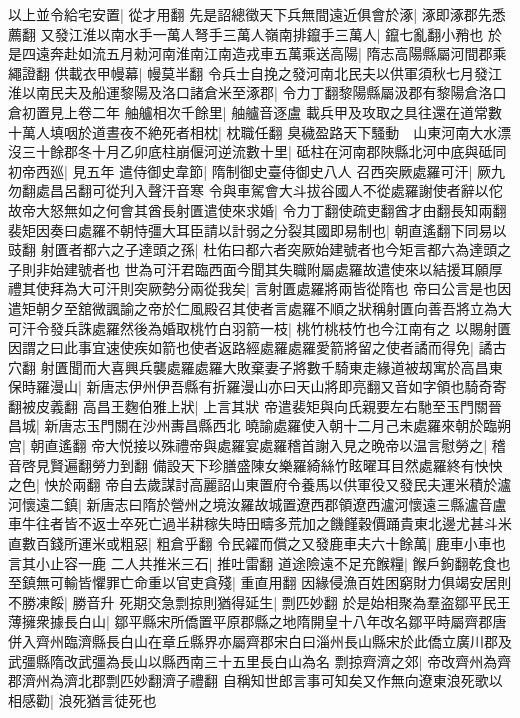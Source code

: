 以上並令給宅安置|{
	從才用翻}
先是詔總徵天下兵無間遠近俱會於涿|{
	涿即涿郡先悉薦翻}
又發江淮以南水手一萬人弩手三萬人嶺南排鑹手三萬人|{
	鑹七亂翻小矟也}
於是四遠奔赴如流五月勑河南淮南江南造戎車五萬乘送高陽|{
	隋志高陽縣屬河間郡乘繩證翻}
供載衣甲幔幕|{
	幔莫半翻}
令兵士自挽之發河南北民夫以供軍須秋七月發江淮以南民夫及船運黎陽及洛口諸倉米至涿郡|{
	令力丁翻黎陽縣屬汲郡有黎陽倉洛口倉初置見上卷二年}
舳艫相次千餘里|{
	舳艫音逐盧}
載兵甲及攻取之具往還在道常數十萬人填咽於道晝夜不絶死者相枕|{
	枕職任翻}
臭穢盈路天下騷動　山東河南大水漂沒三十餘郡冬十月乙卯底柱崩偃河逆流數十里|{
	砥柱在河南郡陜縣北河中底與砥同}
初帝西廵|{
	見五年}
遣侍御史韋節|{
	隋制御史臺侍御史八人}
召西突厥處羅可汗|{
	厥九勿翻處昌呂翻可從刋入聲汗音寒}
令與車駕會大斗拔谷國人不從處羅謝使者辭以佗故帝大怒無如之何會其酋長射匱遣使來求婚|{
	令力丁翻使疏吏翻酋才由翻長知兩翻}
裴矩因奏曰處羅不朝恃彊大耳臣請以計弱之分裂其國即易制也|{
	朝直遙翻下同易以豉翻}
射匱者都六之子達頭之孫|{
	杜佑曰都六者突厥始建號者也今矩言都六為達頭之子則非始建號者也}
世為可汗君臨西面今聞其失職附屬處羅故遣使來以結援耳願厚禮其使拜為大可汗則突厥勢分兩從我矣|{
	言射匱處羅將兩皆從隋也}
帝曰公言是也因遣矩朝夕至舘微諷諭之帝於仁風殿召其使者言處羅不順之狀稱射匱向善吾將立為大可汗令發兵誅處羅然後為婚取桃竹白羽箭一枝|{
	桃竹桃枝竹也今江南有之}
以賜射匱因謂之曰此事宜速使疾如箭也使者返路經處羅處羅愛箭將留之使者譎而得免|{
	譎古穴翻}
射匱聞而大喜興兵襲處羅處羅大敗棄妻子將數千騎東走緣道被刼寓於高昌東保時羅漫山|{
	新唐志伊州伊吾縣有折羅漫山亦曰天山將即亮翻又音如字領也騎奇寄翻被皮義翻}
高昌王麴伯雅上狀|{
	上言其狀}
帝遣裴矩與向氏親要左右馳至玉門關晉昌城|{
	新唐志玉門關在沙州夀昌縣西北}
曉諭處羅使入朝十二月己未處羅來朝於臨朔宫|{
	朝直遙翻}
帝大悦接以殊禮帝與處羅宴處羅稽首謝入見之晩帝以温言慰勞之|{
	稽音啓見賢遍翻勞力到翻}
備設天下珍膳盛陳女樂羅綺絲竹眩曜耳目然處羅終有怏怏之色|{
	怏於兩翻}
帝自去歲謀討高麗詔山東置府令養馬以供軍役又發民夫運米積於瀘河懷遠二鎮|{
	新唐志曰隋於營州之境汝羅故城置遼西郡領遼西瀘河懷遠三縣瀘音盧}
車牛往者皆不返士卒死亡過半耕稼失時田疇多荒加之饑饉穀價踊貴東北邊尤甚斗米直數百錢所運米或粗惡|{
	粗倉乎翻}
令民糴而償之又發鹿車夫六十餘萬|{
	鹿車小車也言其小止容一鹿}
二人共推米三石|{
	推吐雷翻}
道途險遠不足充餱糧|{
	餱戶鉤翻乾食也}
至鎮無可輸皆懼罪亡命重以官吏貪殘|{
	重直用翻}
因緣侵漁百姓困窮財力俱竭安居則不勝凍餒|{
	勝音升}
死期交急剽掠則猶得延生|{
	剽匹妙翻}
於是始相聚為羣盗鄒平民王薄擁衆據長白山|{
	鄒平縣宋所僑置平原郡縣之地隋開皇十八年改名鄒平時屬齊郡唐併入齊州臨濟縣長白山在章丘縣界亦屬齊郡宋白曰淄州長山縣宋於此僑立廣川郡及武彊縣隋改武彊為長山以縣西南三十五里長白山為名}
剽掠齊濟之郊|{
	帝改齊州為齊郡濟州為濟北郡剽匹妙翻濟子禮翻}
自稱知世郎言事可知矣又作無向遼東浪死歌以相感勸|{
	浪死猶言徒死也}
